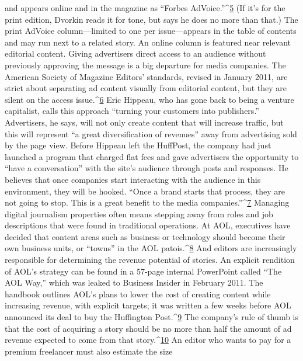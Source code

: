 and appears online and in the magazine as ``Forbes AdVoice.''^{\href{#endnotes-chapter-9}{5}} (If it's for the print
edition, Dvorkin reads it for tone, but says he does no more than that.) The print
AdVoice column—limited to one per issue—appears in the table of contents
and may run next to a related story. An online column is featured near relevant
editorial content.
Giving advertisers direct access to an audience without previously approving
the message is a big departure for media companies. The American Society of
Magazine Editors' standards, revised in January 2011, are strict about separating
ad content visually from editorial content, but they are silent on the access issue.^{\href{#endnotes-chapter-9}{6}}
Eric Hippeau, who has gone back to being a venture capitalist, calls this approach
``turning your customers into publishers.'' Advertisers, he says, will not
only create content that will increase traffic, but this will represent ``a great diversification
of revenues'' away from advertising sold by the page view. Before Hippeau
left the HuffPost, the company had just launched a program that charged
flat fees and gave advertisers the opportunity to ``have a conversation'' with the
site's audience through posts and responses. He believes that once companies start
interacting with the audience in this environment, they will be hooked. ``Once a
brand starts that process, they are not going to stop. This is a great benefit to the
media companies.''^{\href{#endnotes-chapter-9}{7}}
Managing digital journalism properties often means stepping away from roles
and job descriptions that were found in traditional operations. At AOL, executives
have decided that content areas such as business or technology should become
their own business units, or ``towns'' in the AOL patois.^{\href{#endnotes-chapter-9}{8}} And editors are
increasingly responsible for determining the revenue potential of stories.
An explicit rendition of AOL's strategy can be found in a 57-page internal
PowerPoint called ``The AOL Way,'' which was leaked to Business Insider in February
2011. The handbook outlines AOL's plans to lower the cost of creating
content while increasing revenue, with explicit targets; it was written a few weeks
before AOL announced its deal to buy the Huffington Post.^{\href{#endnotes-chapter-9}{9}}
The company's rule of thumb is that the cost of acquiring a story should be
no more than half the amount of ad revenue expected to come from that story.^{\href{#endnotes-chapter-9}{10}}
An editor who wants to pay for a premium freelancer must also estimate the size

